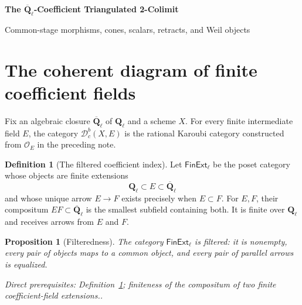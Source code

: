 \documentclass[10pt]{article}
\newtheorem{proposition}[theorem]{Proposition}
\theoremstyle{definition}
\newtheorem{definition}[theorem]{Definition}
\newcommand{\Ql}{\mathbf Q_\ell}
\newcommand{\Qlb}{\overline{\mathbf Q}_\ell}
\newcommand{\Dbc}{\mathcal D^b_c}
\newcommand{\depends}[1]{\par\smallskip\noindent\textit{Direct prerequisites:} #1.}
\begin{document}
\begin{center}
{\large\bfseries The $\Qlb$-Coefficient Triangulated 2-Colimit\par}
\medskip
{\normalsize Common-stage morphisms, cones, scalars, retracts, and Weil objects\par}
\end{center}

\begin{abstract}
This note constructs algebraically closed $\ell$-adic coefficients without
using an infinite coefficient field as a primitive derived coefficient
ring.  Finite coefficient categories are assembled by an explicit pair
category: morphisms are represented over a common finite extension, and
equality, addition, composition, shifts, cones, and scalar multiplication
are all defined at a further common stage.  The Karoubi envelope gives the
idempotent-complete ordinary triangulated 2-colimit.  Separate statements
give its universal property, its comparison with a literal algebraic
$\Qlb$-sheaf under exact descent hypotheses, and the parallel strict
2-colimit of bounded Weil complexes.
\end{abstract}

\tableofcontents

\section{The coherent diagram of finite coefficient fields}

Fix an algebraic closure $\Qlb$ of $\Ql$ and a scheme $X$.  For every
finite intermediate field $E$, the category $\Dbc(X,E)$ is the rational
Karoubi category constructed from $\mathcal O_E$ in the preceding note.

\begin{definition}[The filtered coefficient index]\label{def:finext}
Let $\mathsf{FinExt}_\ell$ be the poset category whose objects are finite
extensions
\[
 \Ql\subset E\subset\Qlb
\]
and whose unique arrow $E\to F$ exists precisely when $E\subset F$.  For
$E,F$, their compositum $EF\subset\Qlb$ is the smallest subfield containing
both.  It is finite over $\Ql$ and receives arrows from $E$ and $F$.
\end{definition}

\begin{proposition}[Filteredness]\label{prop:finext-filtered}
The category $\mathsf{FinExt}_\ell$ is filtered: it is nonempty, every pair
of objects maps to a common object, and every pair of parallel arrows is
equalized.
\depends{Definition~\ref{def:finext}; finiteness of the compositum of two
finite coefficient-field extensions.}
\end{proposition}
\end{document}
